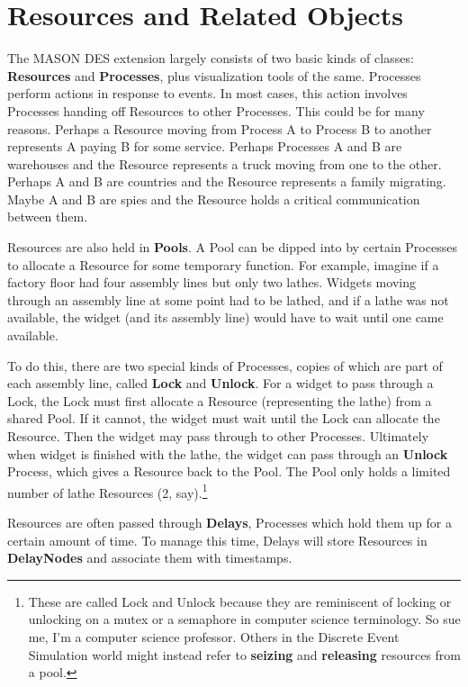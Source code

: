 \documentclass[twoside,10pt]{article}
\begin{document}
\section{Resources and Related Objects}

The MASON DES extension largely consists of two basic kinds of classes:  {\bf Resources} and {\bf Processes}, plus visualization tools of the same.   Processes perform actions in response to events.  In most cases, this action involves Processes handing off Resources to other Processes.  This could be for many reasons.  Perhaps a Resource moving from Process A to Process B to another represents A paying B for some service.  Perhaps Processes A and B are warehouses and the Resource represents a truck moving from one to the other.  Perhaps A and B are countries and the Resource represents a family migrating.  Maybe A and B are spies and the Resource holds a critical communication between them.

Resources are also held in {\bf Pools}.  A Pool can be dipped into by certain Processes to allocate a Resource for some temporary function.  For example, imagine if a factory floor had four assembly lines but only two lathes.  Widgets moving through an assembly line at some point had to be lathed, and if a lathe was not available, the widget (and its assembly line) would have to wait until one came available.

To do this, there are two special kinds of Processes, copies of which are part of each assembly line, called {\bf Lock} and {\bf Unlock}.  For a widget to pass through a Lock, the Lock must first allocate a Resource (representing the lathe) from a shared Pool.  If it cannot, the widget must wait until the Lock can allocate the Resource.  Then the widget may pass through to other Processes.  Ultimately when widget is finished with the lathe, the widget can pass through an {\bf Unlock} Process, which gives a Resource back to the Pool.   The Pool only holds a limited number of lathe Resources (2, say).\footnote{These are called Lock and Unlock because they are reminiscent of locking or unlocking on a mutex or a semaphore in computer science terminology.   So sue me, I'm a computer science professor. Others in the Discrete Event Simulation world might instead refer to {\bf seizing} and {\bf releasing} resources from a pool.}

Resources are often passed through {\bf Delays}, Processes which hold them up for a certain amount of time.  To manage this time, Delays will store Resources in {\bf DelayNodes} and associate them with timestamps. 
  
\end{document}
